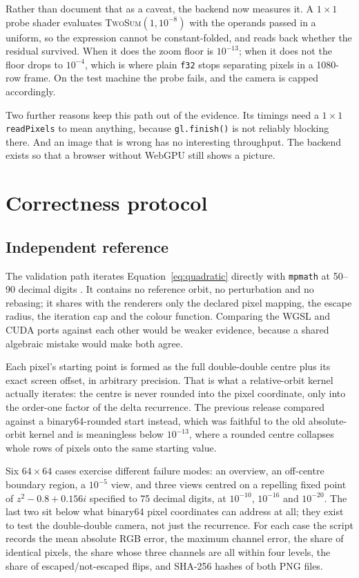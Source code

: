 \documentclass[10pt,a4paper]{article}
\begin{document}
Rather than document that as a caveat, the backend now measures it. A
\(1\times1\) probe shader evaluates \textsc{TwoSum}\((1, 10^{-8})\) with the
operands passed in a uniform, so the expression cannot be constant-folded, and
reads back whether the residual survived. When it does the zoom floor is
\(10^{-13}\); when it does not the floor drops to \(10^{-4}\), which is where
plain \texttt{f32} stops separating pixels in a 1080-row frame. On the test
machine the probe fails, and the camera is capped accordingly.

Two further reasons keep this path out of the evidence. Its timings need a
\(1\times1\) \texttt{readPixels} to mean anything, because \texttt{gl.finish()}
is not reliably blocking there. And an image that is wrong has no interesting
throughput. The backend exists so that a browser without WebGPU still shows a
picture.

\section{Correctness protocol}
\label{sec:correctness}

\subsection{Independent reference}

The validation path iterates Equation~\ref{eq:quadratic} directly with
\texttt{mpmath} at 50--90 decimal digits \cite{mpmath2026}. It contains no
reference orbit, no perturbation and no rebasing; it shares with the renderers
only the declared pixel mapping, the escape radius, the iteration cap and the
colour function. Comparing the WGSL and CUDA ports against each other would be
weaker evidence, because a shared algebraic mistake would make both agree.

Each pixel's starting point is formed as the full double-double centre plus its
exact screen offset, in arbitrary precision. That is what a relative-orbit
kernel actually iterates: the centre is never rounded into the pixel
coordinate, only into the order-one factor of the delta recurrence. The
previous release compared against a binary64-rounded start instead, which was
faithful to the old absolute-orbit kernel and is meaningless below
\(10^{-13}\), where a rounded centre collapses whole rows of pixels onto the
same starting value.

Six \(64\times64\) cases exercise different failure modes: an overview, an
off-centre boundary region, a \(10^{-5}\) view, and three views centred on a
repelling fixed point of \(z^2-0.8+0.156i\) specified to 75 decimal digits, at
\(10^{-10}\), \(10^{-16}\) and \(10^{-20}\). The last two sit below what
binary64 pixel coordinates can address at all; they exist to test the
double-double camera, not just the recurrence. For each case the script records
the mean absolute RGB error, the maximum channel error, the share of identical
pixels, the share whose three channels are all within four levels, the share of
escaped/not-escaped flips, and SHA-256 hashes of both PNG files.
\end{document}
